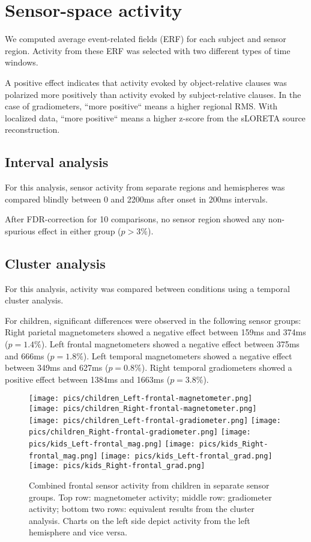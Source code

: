 \section{Sensor-space activity}

We computed average event-related fields (ERF) for each subject and sensor region.
Activity from these ERF was selected with two different types of time windows.

A positive effect indicates that activity evoked by object-relative clauses was polarized more positively than activity evoked by subject-relative clauses. In the case of gradiometers, ``more positive`` means a higher regional RMS. With localized data, ``more positive`` means a higher z-score from the sLORETA source reconstruction.


\subsection{Interval analysis}
For this analysis, sensor activity from separate regions and hemispheres was compared blindly between 0 and 2200ms after onset in 200ms intervals.

After FDR-correction for 10 comparisons, no sensor region showed any non-spurious effect in either group ($p > 3\%$).

\subsection{Cluster analysis}
For this analysis, activity was compared between conditions using a temporal cluster analysis.

For children, significant differences were observed in the following sensor groups:
Right parietal magnetometers showed a negative effect between 159ms and 374ms ($p = 1.4\%$).
Left frontal magnetometers showed a negative effect between 375ms and 666ms ($p = 1.8\%$).
Left temporal magnetometers showed a negative effect between 349ms and 627ms ($p = 0.8\%$).
Right temporal gradiometers showed a positive effect between 1384ms and 1663ms ($p = 3.8\%$).

\begin{figure}[!h]
\begin{center}
\texttt{[image: pics/children\_Left-frontal-magnetometer.png]}
\texttt{[image: pics/children\_Right-frontal-magnetometer.png]}
\texttt{[image: pics/children\_Left-frontal-gradiometer.png]}
\texttt{[image: pics/children\_Right-frontal-gradiometer.png]}
\texttt{[image: pics/kids\_Left-frontal\_mag.png]}
\texttt{[image: pics/kids\_Right-frontal\_mag.png]}
\texttt{[image: pics/kids\_Left-frontal\_grad.png]}
\texttt{[image: pics/kids\_Right-frontal\_grad.png]}
\caption{\label{4.2.activity.kids.frontal} Combined frontal sensor activity from children in separate sensor groups. Top row: magnetometer activity; middle row: gradiometer activity; bottom two rows: equivalent results from the cluster analysis. Charts on the left side depict activity from the left hemisphere and vice versa.}
\end{center}
\end{figure}


